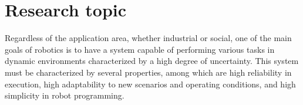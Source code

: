 \section{Research topic}
\label{sec:research_topic}
Regardless of the application area, whether industrial or social, one of the main goals of robotics is to have a system capable of performing various tasks in dynamic environments characterized by a high degree of uncertainty. This system must be characterized by several properties, among which are high reliability in execution, high adaptability to new scenarios and operating conditions, and high simplicity in robot programming. 